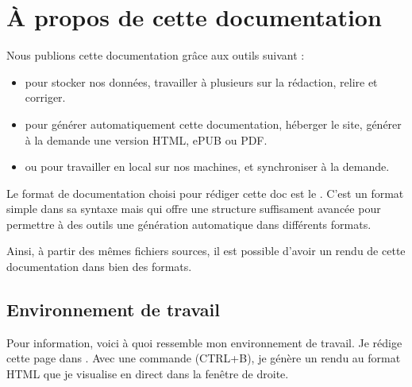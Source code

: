 \documentclass[letterpaper,10pt,french]{sphinxmanual}
\begin{document}
\chapter{À propos de cette documentation}
\label{\detokenize{projet-aPropos:a-propos-de-cette-documentation}}\label{\detokenize{projet-aPropos::doc}}
Nous publions cette documentation grâce aux outils suivant :
\begin{itemize}
\item {} 
 pour stocker nos données, travailler à plusieurs sur la rédaction,
relire et corriger.

\item {} 
 pour générer automatiquement cette documentation, héberger le site,
générer à la demande une version HTML, ePUB ou PDF.

\item {} 
  ou   pour travailler en local sur nos machines, et synchroniser à la demande.

\end{itemize}

Le format de documentation choisi pour rédiger cette doc est le .
C’est un format  simple dans sa syntaxe mais qui offre une structure
suffisament avancée pour permettre à des outils une génération automatique dans différents
formats.

Ainsi, à partir des mêmes fichiers sources, il est possible d’avoir un rendu de cette
documentation dans bien des formats.


\section{Environnement de travail}
\label{\detokenize{projet-aPropos:environnement-de-travail}}
Pour information, voici à quoi ressemble mon environnement de travail.
Je rédige cette page dans . Avec une commande (CTRL+B), je génère un rendu
au format HTML que je visualise en direct dans la fenêtre de droite.

\end{document}
